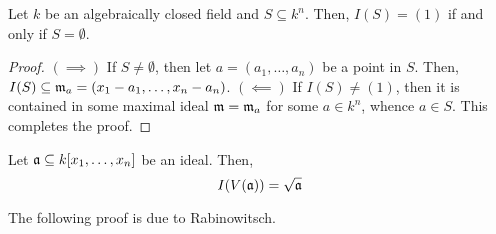 \begin{theorem}
    Let $k$ be an algebraically closed field and $S\subseteq k^n$. Then, $I(S) = (1)$ if and only if $S = \emptyset$.
\end{theorem}
\begin{proof}
    $(\implies)$ If $S\ne\emptyset$, then let $a = (a_1,\dots,a_n)$ be a point in $S$. Then, $I(S)\subseteq\mathfrak m_a = (x_1 - a_1,\dots,x_n - a_n)$.
    $(\impliedby)$ If $I(S)\ne(1)$, then it is contained in some maximal ideal $\mathfrak m = \mathfrak m_a$ for some $a\in k^n$, whence $a\in S$. This completes the proof.
\end{proof}

\begin{theorem}
    Let $\mathfrak a\subseteq k[x_1,\dots,x_n]$ be an ideal. Then, 
    \begin{equation*}
        I(V(\mathfrak a)) = \sqrt{\mathfrak a}
    \end{equation*}
\end{theorem}
The following proof is due to Rabinowitsch.
